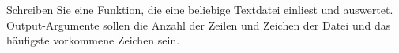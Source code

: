 \begin{aufg}[0]
Schreiben Sie eine Funktion, die eine beliebige Textdatei einliest und
auswertet. Output-Argumente sollen die Anzahl der Zeilen und Zeichen der Datei
und das h\"aufigste vorkommene Zeichen sein. 
\end{aufg}